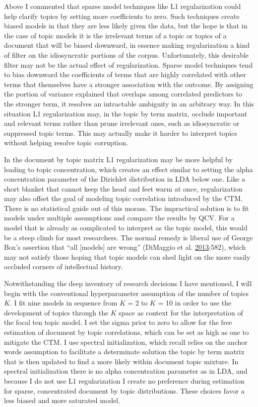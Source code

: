 \documentclass[]{book}
\theoremstyle{definition}
\theoremstyle{definition}
\theoremstyle{definition}
\theoremstyle{remark}
\begin{document}
Above I commented that sparse model techniques like L1 regularization
could help clarify topics by setting more coefficients to zero. Such
techniques create biased models in that they are less likely given the
data, but the hope is that in the case of topic models it is the
irrelevant terms of a topic or topics of a document that will be biased
downward, in essence making regularization a kind of filter on the
idiosyncratic portions of the corpus. Unfortunately, this desirable
filter may not be the actual effect of regularization. Sparse model
techniques tend to bias downward the coefficients of terms that are
highly correlated with other terms that themselves have a stronger
association with the outcome. By assigning the portion of variance
explained that overlaps among correlated predictors to the stronger
term, it resolves an intractable ambiguity in an arbitrary way. In this
situation L1 regularization may, in the topic by term matrix, occlude
important and relevant terms rather than prune irrelevant ones, such as
idiosyncratic or suppressed topic terms. This may actually make it
harder to interpret topics without helping resolve topic corruption.

In the document by topic matrix L1 regularization may be more helpful by
leading to topic concentration, which creates an effect similar to
setting the alpha concentration parameter of the Dirichlet distribution
in LDA below one. Like a short blanket that cannot keep the head and
feet warm at once, regularization may also offset the goal of modeling
topic correlation introduced by the CTM. There is no statistical guide
out of this morass. The impractical solution is to fit models under
multiple assumptions and compare the results by QCV. For a model that is
already as complicated to interpret as the topic model, this would be a
steep climb for most researchers. The normal remedy is liberal use of
George Box's assertion that ``all {[}models{]} are wrong'' (DiMaggio et
al. \protect\hyperlink{ref-DiMaggio2013Exploiting}{2013}:582), which may
not satisfy those hoping that topic models can shed light on the more
easily occluded corners of intellectual history.

Notwithstanding the deep inventory of research decisions I have
mentioned, I will begin with the conventional hyperparameter assumption
of the number of topics \(K\). I fit nine models in sequence from \(K\)
= 2 to \(K\) = 10 in order to use the development of topics through the
\(K\) space as context for the interpretation of the focal ten topic
model. I set the sigma prior to zero to allow for the free estimation of
document by topic correlations, which can be set as high as one to
mitigate the CTM. I use spectral initialization, which recall relies on
the anchor words assumption to facilitate a determinate solution the
topic by term matrix that is then updated to find a more likely within
document topic mixture. In spectral initialization there is no alpha
concentration parameter as in LDA, and because I do not use L1
regularization I create no preference during estimation for sparse,
concentrated document by topic distributions. These choices favor a less
biased and more saturated model.
\end{document}
